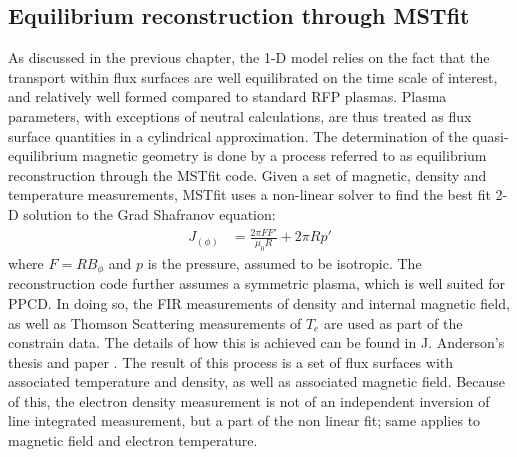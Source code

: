 \subsection{Equilibrium reconstruction through MSTfit}\label{sec:MSTfit}


As discussed in the previous chapter, the 1-D model relies on the fact that the transport within flux surfaces are well equilibrated on the time scale of interest, and relatively well formed compared to standard RFP plasmas. Plasma parameters, with exceptions of neutral calculations, are thus treated as flux surface quantities in a cylindrical approximation. The determination of the quasi-equilibrium magnetic geometry is done by a process referred to as equilibrium reconstruction through the MSTfit code. Given a set of magnetic, density and temperature measurements, MSTfit uses a non-linear solver to find the best fit 2-D solution to the Grad Shafranov equation:
\begin{align}
    J_(\phi) &= \frac{2\pi F F'}{\mu_0 R} + 2\pi Rp'
\end{align}
where $F = RB_{\phi}$ and $p$ is the pressure, assumed to be isotropic. The reconstruction code further assumes a symmetric plasma, which is well suited for PPCD. In doing so, the FIR measurements of density and internal magnetic field, as well as Thomson Scattering measurements of $T_e$ are used as part of the constrain data. The details of how this is achieved can be found in J. Anderson's thesis \cite{Anderson2001} and paper \cite{Anderson2004}. The result of this process is a set of flux surfaces with associated temperature and density, as well as associated magnetic field.  Because of this, the electron density measurement is not of an independent inversion of line integrated measurement, but a part of the non linear fit; same applies to magnetic field and electron temperature. 

